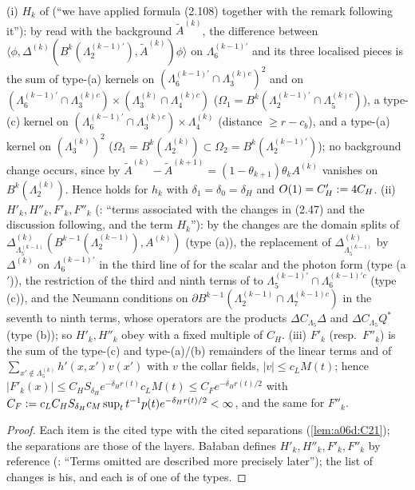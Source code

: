 \begin{lemma}[{\cite[(3.8), (3.10)]{Ba2}}]\label{lem:a06d:C22}
\textup{(i)} $H_k$ of \cite[p.~584]{Ba2} (``we have applied formula (2.108) together with the remark following it''): by \cite[(2.108)]{Ba2} read with the background $\tilde A^{(k)}$, the difference between $\langle\phi,\Delta^{(k)}(B^k(\Lambda^{(k-1)'}_2),\tilde A^{(k)})\phi\rangle$ on $\Lambda^{(k-1)'}_6$ and its three localised pieces is the sum of type-(a) kernels on $(\Lambda^{(k-1)'}_6\cap\Lambda^{(k)c}_3)^2$ and on $(\Lambda^{(k-1)'}_6\cap\Lambda^{(k)c}_3)\times(\Lambda^{(k)}_3\cap\Lambda^{(k)c}_4)$ ($\Omega_1=B^k(\Lambda^{(k-1)'}_2\cap\Lambda^{(k)c}_5)$), a type-(c) kernel on $(\Lambda^{(k-1)'}_6\cap\Lambda^{(k)c}_3)\times\Lambda^{(k)}_4$ (distance $\ge r-c_b$), and a type-(a) kernel on $(\Lambda^{(k)}_3)^2$ ($\Omega_1=B^k(\Lambda^{(k)}_2)\subset\Omega_2=B^k(\Lambda^{(k-1)'}_2)$); no background change occurs, since by \cite[(3.4)]{Ba2} $\tilde A^{(k)}-\tilde A^{(k+1)}=(1-\theta_{k+1})\theta_kA^{(k)}$ vanishes on $B^k(\Lambda^{(k)}_2)$. Hence \cite[(3.8)]{Ba2} holds for $h_k$ with $\delta_1=\delta_0=\delta_H$ and $O(1)=C'_H:=4C_H$. \textup{(ii)} $H'_k,H''_k,F'_k,F''_k$ (\cite[p.~585]{Ba2}: ``terms associated with the changes in (2.47) and the discussion following, and the term $H_k$''): by \cite[(2.47), p.~568]{Ba2} the changes are the domain splits of $\Delta^{(k)}_{\Lambda^{(k-1)}_5}(B^{k-1}(\Lambda^{(k-1)}_2),A^{(k)})$ (type (a)), the replacement of $\Delta^{(k)}_{\Lambda^{(k-1)}_5}$ by $\Delta^{(k)}$ on $\Lambda^{(k-1)'}_6$ in the third line of \cite[(2.47)]{Ba2} for the scalar and the photon form (type (a$'$)), the restriction of the third and ninth terms of \cite[(2.46)]{Ba2} to $\Lambda^{(k-1)'}_5\cap\Lambda^{(k-1)'c}_6$ (type (c)), and the Neumann conditions on $\partial B^{k-1}(\Lambda^{(k-1)}_2\cap\Lambda^{(k-1)c}_7)$ in the seventh to ninth terms, whose operators are the products $\Delta C_{\Lambda_5}\Delta$ and $\Delta C_{\Lambda_5}Q^*$ (type (b)); so $H'_k,H''_k$ obey \cite[(3.8)]{Ba2} with a fixed multiple of $C_H$. \textup{(iii)} $F'_k$ (resp.\ $F''_k$) is the sum of the type-(c) and type-(a)/(b) remainders of the linear terms and of $\sum_{x'\notin\Lambda^{(k)}_5}h'(x,x')v(x')$ with $v$ the collar fields, $|v|\le c_LM(t)$; hence $|F'_k(x)|\le C_HS_{\delta_H}e^{-\delta_Hr(t)}c_LM(t)\le C_Fe^{-\delta_Hr(t)/2}$ with $C_F:= c_LC_HS_{\delta_H}c_M\sup_tt^{-1}p(t)e^{-\delta_Hr(t)/2}<\infty$, and the same for $F''_k$.
\end{lemma}

\begin{proof}
Each item is the cited type with the cited separations (\cref{lem:a06d:C21}); the separations are those of the layers. Ba{\l}aban defines $H'_k,H''_k,F'_k,F''_k$ by reference (\cite[p.~568]{Ba2}: ``Terms omitted are described more precisely later''); the list of changes is his, and each is of one of the types.
\end{proof}

